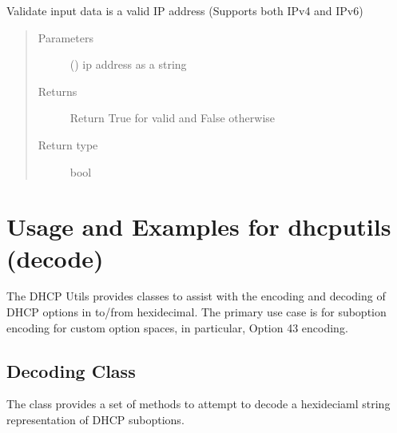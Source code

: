 \documentclass[letterpaper,10pt,english]{sphinxmanual}
\begin{document}
\begin{fulllineitems}
\begin{fulllineitems}
\label{\detokenize{dhcp_decode-class:bloxone.dhcp_decode.validate_ip}}
\sphinxAtStartPar
Validate input data is a valid IP address
(Supports both IPv4 and IPv6)
\begin{quote}\begin{description}
\item[{Parameters}] \leavevmode
\sphinxAtStartPar
{} () \textendash{} ip address as a string

\item[{Returns}] \leavevmode
\sphinxAtStartPar
Return True for valid and False otherwise

\item[{Return type}] \leavevmode
\sphinxAtStartPar
bool

\end{description}\end{quote}

\end{fulllineitems}


\end{fulllineitems}



\section{Usage and Examples for dhcputils (decode)}
\label{\detokenize{dhcp_decode-usage:usage-and-examples-for-dhcputils-decode}}\label{\detokenize{dhcp_decode-usage::doc}}
\sphinxAtStartPar
The DHCP Utils provides classes to assist with the encoding and decoding of
DHCP options in to/from hexidecimal. The primary use case is for sub\sphinxhyphen{}option
encoding for custom option spaces, in particular, Option 43 encoding.


\subsection{Decoding Class}
\label{\detokenize{dhcp_decode-usage:decoding-class}}
\sphinxAtStartPar
The {\hyperref[\detokenize{dhcp_decode-class:bloxone.dhcp_decode}]{}} class provides a set of  methods
to attempt to decode a hexideciaml string representation of DHCP sub\sphinxhyphen{}options.
\end{document}

